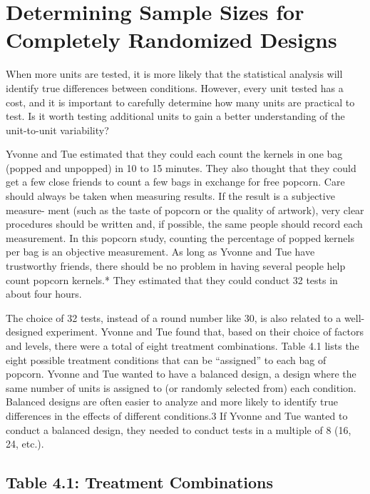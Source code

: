 \documentclass[
]{report}
\theoremstyle{definition}
\theoremstyle{definition}
\theoremstyle{definition}
\theoremstyle{definition}
\theoremstyle{remark}
\begin{document}
\hypertarget{determining-sample-sizes-for-completely-randomized-designs}{%
\section{Determining Sample Sizes for Completely Randomized Designs}\label{determining-sample-sizes-for-completely-randomized-designs}}

When more units are tested, it is more likely that the statistical analysis will identify true differences between
conditions. However, every unit tested has a cost, and it is important to carefully determine how many units are
practical to test. Is it worth testing additional units to gain a better understanding of the unit-to-unit variability?

Yvonne and Tue estimated that they could each count the kernels in one bag (popped and unpopped) in
10 to 15 minutes. They also thought that they could get a few close friends to count a few bags in exchange
for free popcorn. Care should always be taken when measuring results. If the result is a subjective measure-
ment (such as the taste of popcorn or the quality of artwork), very clear procedures should be written and, if
possible, the same people should record each measurement. In this popcorn study, counting the percentage of
popped kernels per bag is an objective measurement. As long as Yvonne and Tue have trustworthy friends,
there should be no problem in having several people help count popcorn kernels.* They estimated that they
could conduct 32 tests in about four hours.

The choice of 32 tests, instead of a round number like 30, is also related to a well-designed experiment.
Yvonne and Tue found that, based on their choice of factors and levels, there were a total of eight treatment
combinations. Table 4.1 lists the eight possible treatment conditions that can be ``assigned'' to each bag of
popcorn. Yvonne and Tue wanted to have a balanced design, a design where the same number of units is
assigned to (or randomly selected from) each condition. Balanced designs are often easier to analyze and more
likely to identify true differences in the effects of different conditions.3 If Yvonne and Tue wanted to conduct
a balanced design, they needed to conduct tests in a multiple of 8 (16, 24, etc.).

\hypertarget{table-4.1-treatment-combinations}{%
\subsection{Table 4.1: Treatment Combinations}\label{table-4.1-treatment-combinations}}
\end{document}
